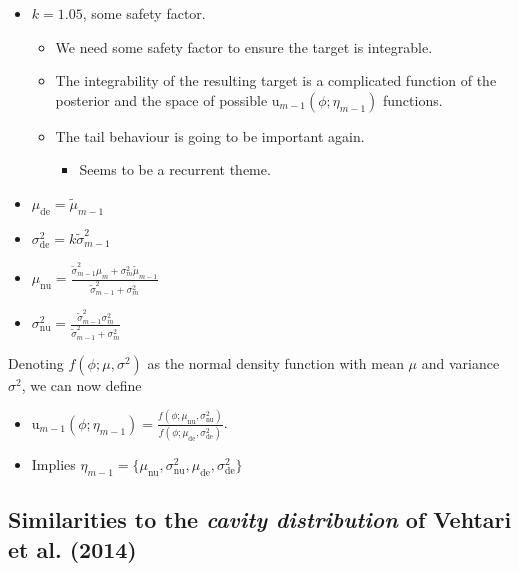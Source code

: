 \documentclass[10pt,a4paper,]{article}
\providecommand{\tightlist}{%
  \setlength{\itemsep}{0pt}\setlength{\parskip}{0pt}}
\newcommand{\tarw}{\text{u}}
\newcommand{\modelindex}{m}
\begin{document}
\begin{itemize}
\item
  \(k = 1.05\), some safety factor.

  \begin{itemize}
  \tightlist
  \item
    We need some safety factor to ensure the target is integrable.
  \item
    The integrability of the resulting target is a complicated function
    of the posterior and the space of possible
    \(\tarw_{\modelindex - 1}(\phi; \eta_{\modelindex - 1})\) functions.
  \item
    The tail behaviour is going to be important again.

    \begin{itemize}
    \tightlist
    \item
      Seems to be a recurrent theme.
    \end{itemize}
  \end{itemize}
\item
  \(\mu_{\text{de}} = \tilde{\mu}_{\modelindex - 1}\)
\item
  \(\sigma^{2}_{\text{de}} = k \tilde{\sigma}^{2}_{\modelindex - 1}\)
\item
  \(\mu_{\text{nu}} = \frac{\tilde{\sigma}^{2}_{\modelindex - 1} \mu_{\modelindex} + \sigma^{2}_{\modelindex}\tilde{\mu}_{\modelindex - 1}} {\tilde{\sigma}^{2}_{\modelindex - 1} + \sigma^{2}_{\modelindex}}\)
\item
  \(\sigma^{2}_{\text{nu}} = \frac{\tilde{\sigma}^{2}_{\modelindex - 1} \sigma^{2}_{\modelindex}}{\tilde{\sigma}^{2}_{\modelindex - 1} + \sigma^{2}_{\modelindex}}\)
\end{itemize}

Denoting \(f(\phi; \mu, \sigma^2)\) as the normal density function with
mean \(\mu\) and variance \(\sigma^2\), we can now define

\begin{itemize}
\tightlist
\item
  \(\tarw_{\modelindex - 1}(\phi; \eta_{\modelindex - 1}) = \frac{f(\phi; \mu_{\text{nu}}, \sigma^2_{\text{nu}})} {f(\phi; \mu_{\text{de}}, \sigma^2_{\text{de}})}\).
\item
  Implies
  \(\eta_{\modelindex - 1} = \{\mu_{\text{nu}}, \sigma^{2}_{\text{nu}}, \mu_{\text{de}}, \sigma^{2}_{\text{de}}\}\)
\end{itemize}

\subsection{\texorpdfstring{Similarities to the \emph{cavity
distribution} of Vehtari et al.
(2014)}{Similarities to the cavity distribution of Vehtari et al. (2014)}}\label{similarities-to-the-cavity-distribution-of-vehtarietal14}
\end{document}
